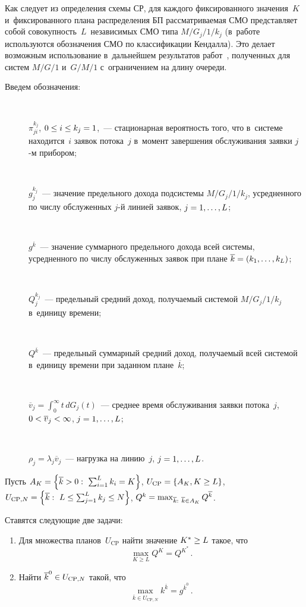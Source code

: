 \begin{multicols}{2}
  Как следует из определения схемы СР, для каж\-до\-го фиксированного 
значения~$K$ и~фиксированного плана распределения БП рассматриваемая 
СМО представляет собой совокупность~$L$~независимых СМО типа 
$M/G_j/1/k_j$ (в~работе используются обозначения СМО по классификации 
Кендалла). Это делает возможным использование в~дальнейшем результатов 
работ~\cite{11-ag, 12-ag, 13-ag}, полученных для систем $M/G/1$ и~$G/M/1$ 
с~ограничением на длину очереди.
  
  Введем обозначения:
  \begin{description}
  \item[\,]
  $\pi_{ji}^{k_j}$, $0\leq i\leq k_j\hm=1$,~--- стационарная вероятность того, 
что в~системе находится~$i$ заявок потока~$j$ в~момент завершения 
обслуживания заявки $j$-м прибором;
  \item[\,]
  $g_j^{k_j}$~--- значение предельного дохода подсистемы $M/G_j/1/k_j$, 
усредненного по числу обслуженных $j$-й линией заявок, $j\hm=1,\ldots, L$;
  \item[\,]
  $g^{\overline{k}}$~--- значение суммарного предельного дохода всей 
системы, усредненного по числу обслуженных заявок при плане 
$\overline{k}\hm= (k_1, \ldots, k_L)$;
  \item[\,]
  $Q_j^{k_j}$~--- предельный средний доход, получаемый системой 
$M/G_j/1/k_j$ в~единицу времени;
  \item[\,]
  $Q^{\overline{k}}$~--- предельный суммарный средний доход, получаемый 
всей системой в~единицу времени при заданном плане~$\overline{k}$;
  \item[\,]
  $\overline{v}_j=\int\nolimits_0^\infty t\,dG_j(t)$~--- среднее время 
обслуживания заявки потока~$j$, $0\hm< \overline{v}_j\hm<\infty$, 
$j\hm=1,\ldots, L$;
  \item[\,]
  $\rho_j=\lambda_j \overline{v}_j$~--- нагрузка на линию~$j$, $j\hm=1,\ldots, 
L$.
  \end{description}
  
  Пусть $A_K\hm= \left\{ \overline{k}>0:\ \sum\nolimits_{i=1}^L k_i\hm= K\right\}$, 
$U_{\mathrm{CP}}\hm= \left\{ A_K, K\hm\geq L\right\}$, $U_{\mathrm{CP},N}\hm= \left\{ 
\overline{k}:\ L\hm\leq \sum\nolimits^L_{j=1} k_j \hm\leq N\right\}$, 
$Q^k\hm=\max\nolimits_{\overline{k}:\ \overline{k}\in A_K} Q^{\overline{k}}$.
  
  Ставятся следующие две задачи: 
  \noindent
  \begin{enumerate}[1.]
\item Для множества планов~$U_{\mathrm{CP}}$ найти значение $K^*\hm\geq L$ 
такое, что 
\begin{equation}
\max\limits_{K\geq L} Q^K=Q^{K^*}\,.
\label{e1-ag}
\end{equation}
\item Найти $\overline{k}^0\hm\in U_{\mathrm{CP},N}$ такой, что
\begin{equation}
\max\limits_{\overline{k}\in U_{\mathrm{CP},N}} k^{\overline{k}}=g^{\overline{k}^0}\,.
\label{e2-ag}
\end{equation}
\end{enumerate}
  

\end{multicols}
